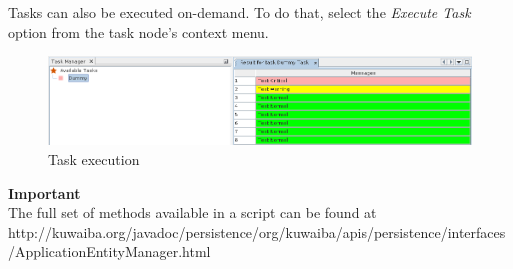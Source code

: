 \documentclass[a4paper]{article}
\begin{document}
		Tasks can also be executed on-demand. To do that, select the \textit{Execute Task} option from the task node's context menu.
		\begin{figure}[h!]
			\centering
			\includegraphics[width=1.1\linewidth]{img/task_manager_execute_task.png}
			\caption{Task execution}
			\label{fig:task_manager_execute_task}
		\end{figure}
		\begin{framed} {\large \textbf{Important}}\\
			The full set of methods available in a script can be found at \\ \tiny{http://kuwaiba.org/javadoc/persistence/org/kuwaiba/apis/persistence/interfaces/ApplicationEntityManager.html}
		\end{framed}
	\newpage
\end{document}

